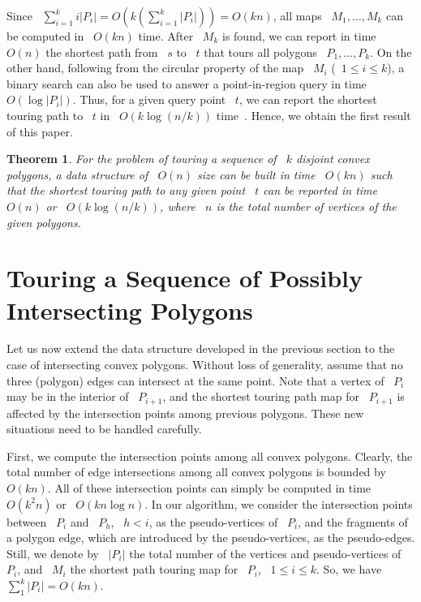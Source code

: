\documentclass[11pt]{article}
\newtheorem{theorem}{Theorem}
\begin{document}
Since ~\(\sum_{i=1}^k i|P_i| = O\!\left(k\left(\sum_{i=1}^k |P_i|\right)\right) = O(kn)\), all maps ~\(M_1, \ldots, M_k\) can be computed in ~\(O(kn)\) time.
After ~\(M_k\) is found, we can report in time ~\(O(n)\) the shortest path from ~\(s\) to ~\(t\) that tours all polygons ~\(P_1, \ldots, P_k\).
On the other hand, following from the circular property of the map ~\(M_i\) (~\(1 \le i \le k\)), a binary search can also be used to answer a point-in-region query in time ~\(O(\log|P_i|)\).
Thus, for a given query point ~\(t\), we can report the shortest touring path to ~\(t\) in ~\(O(k\log(n/k))\) time~\cite{ref6}.
Hence, we obtain the first result of this paper.

\begin{theorem}
\label{thm:disjoint}
For the problem of touring a sequence of ~\(k\) disjoint convex polygons, a data structure of ~\(O(n)\) size can be built in time ~\(O(kn)\) such that the shortest touring path to any given point ~\(t\) can be reported in time ~\(O(n)\) or ~\(O(k\log(n/k))\), where ~\(n\) is the total number of vertices of the given polygons.
\end{theorem}

\section{Touring a Sequence of Possibly Intersecting Polygons}
\label{sec:intersecting}

Let us now extend the data structure developed in the previous section to the case of intersecting convex polygons.
Without loss of generality, assume that no three (polygon) edges can intersect at the same point.
Note that a vertex of ~\(P_i\) may be in the interior of ~\(P_{i+1}\), and the shortest touring path map for ~\(P_{i+1}\) is affected by the intersection points among previous polygons.
These new situations need to be handled carefully.

First, we compute the intersection points among all convex polygons.
Clearly, the total number of edge intersections among all convex polygons is bounded by ~\(O(kn)\).
All of these intersection points can simply be computed in time ~\(O(k^2n)\) or ~\(O(kn\log n)\).
In our algorithm, we consider the intersection points between ~\(P_i\) and ~\(P_h\), ~\(h < i\), as the pseudo-vertices of ~\(P_i\), and the fragments of a polygon edge, which are introduced by the pseudo-vertices, as the pseudo-edges.
Still, we denote by ~\(|P_i|\) the total number of the vertices and pseudo-vertices of ~\(P_i\), and ~\(M_i\) the shortest path touring map for ~\(P_i\), ~\(1 \le i \le k\).
So, we have ~\(\sum_1^k |P_i| = O(kn)\).
\end{document}
